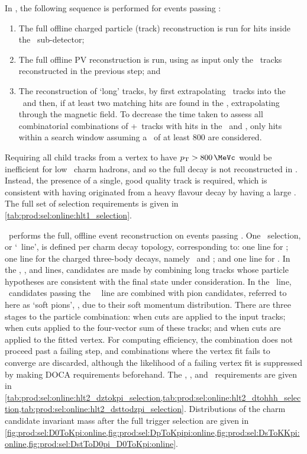 In \hltone, the following sequence is performed for events passing \lzero:
\begin{enumerate}
  \item The full offline charged particle (track) reconstruction is run for 
    hits inside the \velo\ sub-detector;
  \item The full offline \ac{PV} reconstruction is run, using as input only the 
    \velo\ tracks reconstructed in the previous step; and
  \item The reconstruction of `long' tracks, by first extrapolating \velo\ 
    tracks into the \ttracker\ and then, if at least two matching hits are 
    found in the \ttracker, extrapolating through the magnetic field.
    To decrease the time taken to assess all combinatorial combinations of 
    \velo+\ttracker\ tracks with hits in the \itracker\ and \otracker, only 
    hits within a search window assuming a \pT\ of at least \SI{800}{\MeVc} are 
    considered.
\end{enumerate}
Requiring all child tracks from a vertex to have $\pT > \SI{800}{\MeVc}$ would 
be inefficient for low \pT\ charm hadrons, and so the full decay is not 
reconstructed in \hltone.
Instead, the presence of a single, good quality track is required, which is 
consistent with having originated from a heavy flavour decay by having a large 
\ipchisq.
The full set of selection requirements is given in 
\cref{tab:prod:sel:online:hlt1_selection}.

\hlttwo\ performs the full, offline event reconstruction on events passing 
\hltone.
One \hlttwo\ selection, or `\hlttwo\ line', is defined per charm decay 
topology, corresponding to: one line for \DzToKpi; one line for the charged 
three-body decays, namely \DpToKpipi\ and \DspToKKpi; and one line for 
\DstToDzpi.
In the \PDzero, \PDplus, and \PDsplus lines, candidates are made by combining 
long tracks whose particle hypotheses are consistent with the final state under 
consideration.
In the \PDstarp\ line, \PDzero\ candidates passing the \PDzero\ \hlttwo\ line 
are combined with pion candidates, referred to here as `soft pions', 
\Ppiplussoft, due to their soft momentum distribution.
There are three stages to the particle combination: when cuts are applied to 
the input tracks; when cuts applied to the four-vector sum of these tracks; and 
when cuts are applied to the fitted vertex.
For computing efficiency, the combination does not proceed past a failing step, 
and combinations where the vertex fit fails to converge are discarded, although 
the likelihood of a failing vertex fit is suppressed by making \ac{DOCA} 
requirements beforehand.
The \DzToKpi, \DTohhh, and \DstToDzpi\ requirements are given in 
\cref{tab:prod:sel:online:hlt2_dztokpi_selection,tab:prod:sel:online:hlt2_dtohhh_selection,tab:prod:sel:online:hlt2_dsttodzpi_selection}.
Distributions of the charm candidate invariant mass after the full trigger 
selection are given in 
\cref{fig:prod:sel:D0ToKpi:online,fig:prod:sel:DpToKpipi:online,fig:prod:sel:DsToKKpi:online,fig:prod:sel:DstToD0pi_D0ToKpi:online}.

